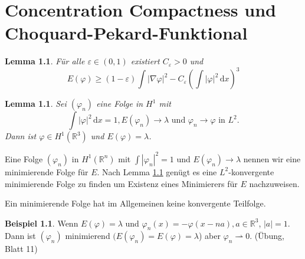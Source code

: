 \documentclass[
paper=a4,
bibtotocnumbered,
liststotocnumbered,
tablecaptionabove,
pointlessnumbers,
twoside,
openright,
10pt
]
{report}
\let\phi\varphi
\newtheorem{lem}[thm]{Lemma}
\theoremstyle{definition}
\newtheorem*{bsp}{Beispiel}
\numberwithin{equation}{chapter}
\begin{document}
\chapter{Concentration Compactness und Choquard-Pekard-Funktional}

\setcounter{thm}{4}
\begin{lem}\label{5.5}
Für alle $\varepsilon \in (0,1)$ existiert $C_\varepsilon >0$ und
\begin{equation}
E(\phi) \ge (1-\varepsilon) \int |\nabla \phi|^2- C_{\varepsilon} (\int |\phi|^2\, \mathrm dx)^3
\end{equation}
\end{lem}


\setcounter{thm}{7}
\begin{lem}\label{5.8}
Sei $(\phi_n)$ eine Folge in $H^1$ mit
\begin{equation}
\int |\phi|^2\, \mathrm dx = 1, E(\phi_n) \to \lambda \text{ und } \phi_n \to \phi \text{ in } L^2.
\end{equation}
Dann ist $\phi \in H^1(\mathbb R^3)$ und $E(\phi) = \lambda$.
\end{lem}

Eine Folge $(\phi_n)$ in $H^1(\mathbb R^n)$ mit $\int |\phi_n|^2=1$ und $E(\phi_n) \to \lambda$ nennen wir eine minimierende Folge für $E$. Nach Lemma \ref{5.8} genügt es eine $L^2$-konvergente minimierende Folge zu finden um Existenz eines Minimierers für $E$ nachzuweisen.  

Ein minimierende Folge hat im Allgemeinen keine konvergente Teilfolge.

\begin{bsp}
Wenn $E(\phi) = \lambda$ und $\phi_n(x) = -\phi(x-na), a\in \mathbb R^3$, $|a|=1$.  Dann ist $(\phi_n)$ minimierend $(E(\phi_n) = E(\phi) = \lambda$) aber $\phi_n \rightharpoonup 0$. (Übung, Blatt 11)
\end{bsp}
\end{document}
